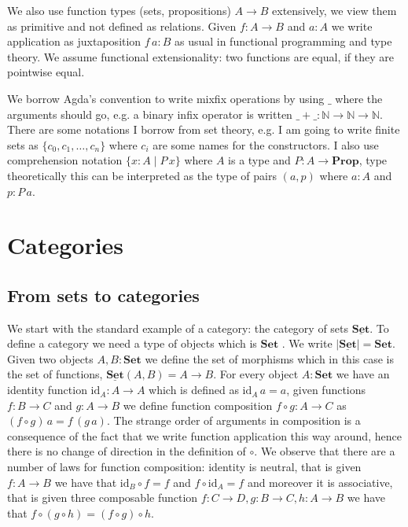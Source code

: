 \documentclass{article}
\newcommand{\Type}{\mathbf{Type}}
\newcommand{\TYPE}{\mathbf{TYPE}}
\newcommand{\Prop}{\mathbf{Prop}}
\newcommand{\PROP}{\mathbf{PROP}}
\newcommand{\Set}{\mathbf{Set}}
\newcommand{\SET}{\mathbf{SET}}
\newcommand{\cat}[1]{\underline{\mathbf{#1}}}
\newcommand{\cSet}{\cat{\Set}}
\newcommand{\obj}[1]{|#1|}
\newcommand{\id}{\mathrm{id}}
\newcommand{\Nat}{\mathbb{N}}
\begin{document}

We also use function types (sets, propositions) $A \to B$  extensively, we view them as primitive and not defined as relations. Given $f : A \to B$ and $a : A$ we write application as juxtaposition $f\,a : B$ as usual in functional programming and type theory. We assume functional extensionality: two functions are equal, if they are pointwise equal. 

We borrow Agda's convention to write mixfix operations by using $\_$ where the arguments should go, e.g. a binary infix operator is written $\_+\_ : \Nat \to \Nat \to \Nat$. There are some notations I borrow from set theory, e.g. I am going to write finite sets as $\{c_0,c_1, \dots, c_n \}$ where $c_i$ are some names for the constructors. I also use comprehension notation $\{ x : A \mid P\,x \}$ where $A$ is a type and $P :A \to \Prop$, type theoretically this can be interpreted as the type of pairs $(a,p)$ where $a:A$ and $p : P\,a$.%

\section{Categories}
\label{sec:categories}

\subsection{From sets to categories}
\label{sec:from-sets-categories}

We start with the standard example of a category: the category of sets $\cSet$. To define a category we need a type of objects which is $\Set$
. We write $\obj{\cSet} = \Set$. 
Given two objects $A,B : \Set$ we define the set of morphisms which in this case is the set of functions, $\cSet(A,B) = A \to B$. For every object $A : \Set$ we have an identity function $\id_A : A \to A$ which is defined as $\id_A\,a = a$, given functions $f : B \to C$ and $g : A \to B$ we define function composition $f \circ g : A \to C$ as $(f\circ g)\,a = f\,(g\,a)$. The strange order of arguments in composition is a consequence of the fact that we write function application this way around, hence there is no change of direction in the definition of $\circ$. We observe that there are a number of laws for function composition: identity is neutral, that is given $f : A \to B$ we have that $\id_B \circ f = f$ and $f \circ \id_A = f$ and moreover it is associative, that is given three composable function $f : C \to D, g : B \to C, h : A \to B$ we have that $f \circ (g \circ h) = (f \circ g) \circ h$.
\end{document}
